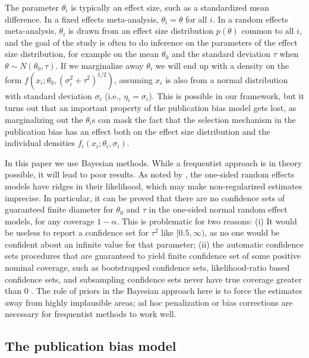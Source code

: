 \documentclass[useAMS,usenatbib,referee]{biom}
\renewcommand{\sqrt}[1]{(#1)^{1/2}}
\begin{document}
The parameter $\theta_{i}$ is typically an effect size, such as a standardized mean difference. In a fixed effects meta-analysis, $\theta_{i}=\theta$ for all $i$. In a random effects meta-analysis, $\theta_{i}$ is drawn from an effect size distribution $p(\theta)$ common to all $i$, and the goal of the study is often to do inference on the parameters of the effect size distribution, for example on the mean $\theta_{0}$ and the standard deviation $\tau$ when $\theta \sim N(\theta_{0},\tau)$. If we marginalize away $\theta_{i}$ we will end up with a density on the form $f(x_{i}; \theta_{0},\sqrt{\sigma_{i}^{2}+\tau^{2}})$, assuming $x_{i}$ is also from a normal distribution with standard deviation $\sigma_{i}$ (i.e., $\eta_i = \sigma_i$). This is possible in our framework, but it turns out that an important property of the publication bias model gets lost, as marginalizing out the $\theta_{i}$s can mask the fact that the selection mechanism in the publication bias has an effect both on the effect size distribution and the individual densities $f_{i}(x_{i};\theta_i, \sigma_i)$.

In this paper we use Bayesian methods. While a frequentist approach is in theory possible, it will lead to poor results. As noted by \citet[Appendix, 1]{mcshane2016adjusting}, the one-sided random effects models have ridges in their likelihood, which may make non-regularized estimates imprecise. In particular, it can be proved \citep{Moss2019} that there are no confidence sets of guaranteed finite diameter for $\theta_{0}$ and $\tau$ in the one-sided normal random effect models, for any coverage $1-\alpha$. This is problematic for two reasons: (i) It would be useless to report a confidence set for $\tau^{2}$ like $[0.5,\infty)$, as no one would be confident about an infinite value for that parameter; (ii) the automatic confidence sets procedures that are guaranteed to yield finite confidence set of some positive nominal coverage, such as bootstrapped confidence sets, likelihood-ratio based confidence sets, and subsampling confidence sets never have true coverage greater than $0$ \citep[see][]{gleser996bootstrap, Moss2019}. The role of priors in the Bayesian approach here is to force the estimates away from highly implausible areas; ad hoc penalization or bias corrections are necessary for frequentist methods to work well.

\subsection{The publication bias model} \label{subsect:publicationBias}
\end{document}
